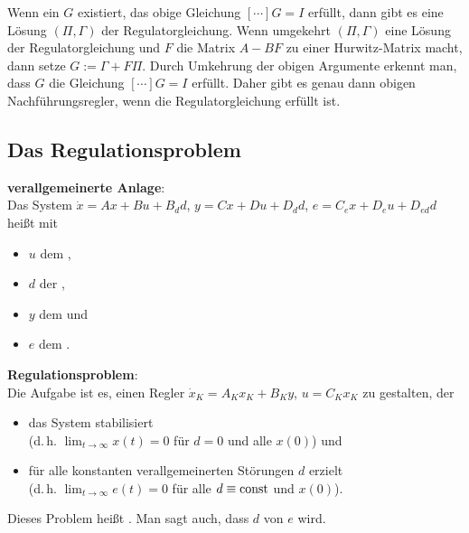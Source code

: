 Wenn ein $G$ existiert, das obige Gleichung $[\dotsb]G = I$ erfüllt,
dann gibt es eine Lösung $(\Pi, \Gamma)$ der Regulatorgleichung.
Wenn umgekehrt $(\Pi, \Gamma)$ eine Lösung der Regulatorgleichung und $F$ die Matrix
$A - BF$ zu einer Hurwitz-Matrix macht, dann setze $G := \Gamma + F\Pi$.
Durch Umkehrung der obigen Argumente erkennt man, dass $G$ die Gleichung $[\dotsb]G = I$ erfüllt.
Daher gibt es genau dann obigen Nachführungsregler, wenn die Regulatorgleichung erfüllt ist.

\pagebreak

\subsection{%
    Das Regulationsproblem%
}

\textbf{verallgemeinerte Anlage}:\\
Das System $\dot{x} = Ax + Bu + B_d d$, $y = Cx + Du + D_d d$, $e = C_e x + D_e u + D_{ed} d$
heißt  mit
\begin{itemize}
    \item
    $u$ dem ,
    
    \item
    $d$ der ,
    
    \item
    $y$ dem  und
    
    \item
    $e$ dem .
\end{itemize}

\textbf{Regulationsproblem}:\\
Die Aufgabe ist es, einen Regler $\dot{x}_K = A_K x_K + B_K y$, $u = C_K x_K$
zu gestalten, der
\begin{itemize}
    \item
    das System stabilisiert\\
    (d.\,h. $\lim_{t \to \infty} x(t) = 0$ für $d = 0$ und alle $x(0)$) und
    
    \item
    für alle konstanten verallgemeinerten Störungen $d$ erzielt\\
    (d.\,h. $\lim_{t \to \infty} e(t) = 0$ für alle $d \equiv \text{const}$ und $x(0)$).
\end{itemize}
Dieses Problem heißt .
Man sagt auch, dass $d$ von $e$
 wird.

